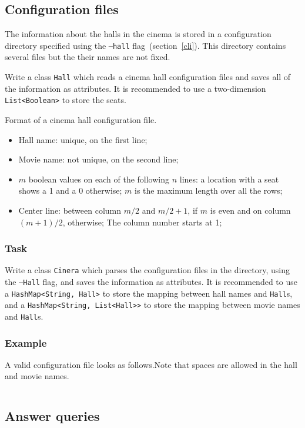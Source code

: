 \documentclass[11pt,a4paper]{article}
\begin{document}
\subsection{Configuration files}

The information about the halls in the cinema is stored in a configuration directory specified using the {\tt --hall} flag~(section~\ref{cli}). This directory contains several files but the their names are not fixed.

Write a class \texttt{Hall} which reads a cinema hall configuration files and saves all of the information as attributes. It is recommended to use a two-dimension \texttt{List<Boolean>} to store the seats.

Format of a cinema hall configuration file.
\begin{itemize}
\item Hall name: unique, on the first line;
\item Movie name: not unique, on the second line;
\item $m$ boolean values on each of the following $n$ lines: a location with a seat shows a 1 and a 0 otherwise; $m$ is the maximum length over all the rows;
\item Center line: between column $m/2$ and $m/2+1$, if $m$ is even and on column $(m+1)/2$, otherwise; The column number starts at 1;
\end{itemize}


\subsubsection*{Task}
Write a class \texttt{Cinera} which parses the configuration files in the directory, using the \texttt{--Hall} flag, and saves the information as attributes. It is recommended to use a \texttt{HashMap<String, Hall>} to store the mapping between hall names and \texttt{Hall}s, and a \texttt{HashMap<String, List<Hall>>} to store the mapping between movie names and \texttt{Hall}s.

\subsubsection*{Example}
A valid configuration file looks as follows.Note that spaces are allowed in the hall and movie names.

\inputminted{shell}{hall/1.txt}
\subsection{Answer queries}
\end{document}
